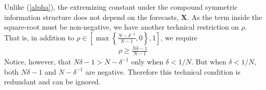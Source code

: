 \documentclass[11pt,twoside]{article}
\begin{document}
Unlike (\ref{alpha}), the extremizing constant under the compound symmetric information structure does not depend on the forecasts, $\boldsymbol{X}$. As the term inside the square-root must be non-negative, we have another technical restriction on $\rho$. That is, in addition to $\rho \in \left[  \max \left\{ \frac{N-\delta^{-1}}{N-1}, 0\right\}, 1 \right]$, we require
\begin{align*}
\rho \geq \frac{N\delta - 1}{N-1}
\end{align*}
Notice, however, that $N\delta - 1 > N - \delta^{-1}$ only when $\delta < 1/N$. But when $\delta < 1/N$, both $N\delta - 1$ and $N - \delta^{-1}$ are negative. Therefore this technical condition is redundant and can be ignored. 




%
%
%
%
%
%
%
\end{document}

